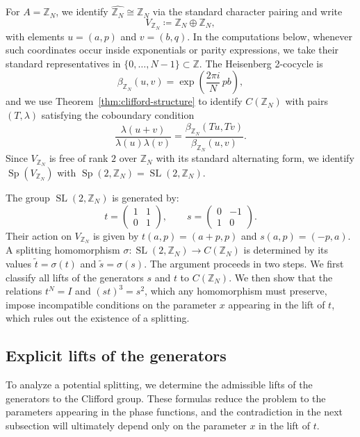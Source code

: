 \documentclass[11pt, reqno]{amsart}
\theoremstyle{definition}
\theoremstyle{remark}
\newcommand{\Z}{\mathbb{Z}}
\DeclareMathOperator{\Sp}{Sp}
\DeclareMathOperator{\SL}{SL}
\begin{document}
For $A=\Z_N$, we identify $\widehat{\Z_N}\cong \Z_N$ via the standard character pairing and write
\[
V_{\Z_N} \coloneqq \Z_N \oplus \Z_N,
\]
with elements $u = (a, p)$ and $v = (b, q)$. In the computations below, whenever such coordinates occur inside exponentials or parity expressions, we take their standard representatives in $\{0,\dots,N-1\}\subset \Z$. The Heisenberg 2-cocycle is
\begin{equation}
\beta_{\Z_N}(u, v) = \exp\!\left(\frac{2\pi i}{N}\, pb\right),
\end{equation}
and we use Theorem~\ref{thm:clifford-structure} to identify $C(\Z_N)$ with pairs $(T, \lambda)$ satisfying the coboundary condition
\begin{equation}\label{eq:cob-N}
\frac{\lambda(u + v)}{\lambda(u)\lambda(v)} = \frac{\beta_{\Z_N}(Tu, Tv)}{\beta_{\Z_N}(u, v)}.
\end{equation}
Since $V_{\Z_N}$ is free of rank $2$ over $\Z_N$ with its standard alternating form, we identify $\Sp(V_{\Z_N})$ with $\Sp(2,\Z_N)=\SL(2,\Z_N)$.

The group $\SL(2, \Z_N)$ is generated by:
\begin{equation}\label{eq:cyclic-generators}
t = \begin{pmatrix} 1 & 1 \\ 0 & 1 \end{pmatrix}, \qquad
s = \begin{pmatrix} 0 & -1 \\ 1 & 0 \end{pmatrix}.
\end{equation}
Their action on $V_{\Z_N}$ is given by $t(a, p) = (a + p, p)$ and $s(a, p) = (-p, a)$. A splitting homomorphism $\sigma: \SL(2, \Z_N) \to C(\Z_N)$ is determined by its values $\tilde{t} = \sigma(t)$ and $\tilde{s} = \sigma(s)$.
The argument proceeds in two steps. We first classify all lifts of the generators $s$ and $t$ to $C(\Z_N)$. We then show that the relations $t^N=I$ and $(st)^3=s^2$, which any homomorphism must preserve, impose incompatible conditions on the parameter $x$ appearing in the lift of $t$, which rules out the existence of a splitting.

\subsection{Explicit lifts of the generators}

To analyze a potential splitting, we determine the admissible lifts of the generators to the Clifford group. These formulas reduce the problem to the parameters appearing in the phase functions, and the contradiction in the next subsection will ultimately depend only on the parameter $x$ in the lift of $t$.
\end{document}
